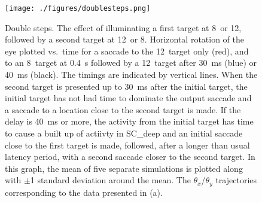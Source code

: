 \documentclass{frontiersSCNS}
\begin{document}
\begin{figure}[!ht]
\begin{center}
\texttt{[image: ./figures/doublesteps.png]}
\end{center}
\caption{ Double steps. The effect of illuminating a first target at 8\dg~or
12\dg, followed by a second target at 12\dg~or 8\dg.  Horizontal
rotation of the eye plotted vs.~time for a saccade to the 12\dg~target
only (red), and to an 8\dg~target at 0.4~s followed by a 12\dg~target
after 30~ms (blue) or 40~ms (black). The timings are indicated by
vertical lines. When the second target is presented up to 30~ms after
the initial target, the initial target has not had time to dominate
the output saccade and a saccade to a location close to the second
target is made. If the delay is 40~ms or more, the activity from the
initial target has time to cause a built up of actiivty in SC\_deep
and an initial saccade close to the first target is made, followed,
after a longer than usual latency period, with a second saccade closer
to the second target. In this graph, the mean of five separate
simulations is plotted along with $\pm$1 standard deviation around the
mean.  The $\theta_{x}$/$\theta_{y}$ trajectories corresponding to
the data presented in (a).}
\label{fig:doublesteps}
\end{figure}
\end{document}
